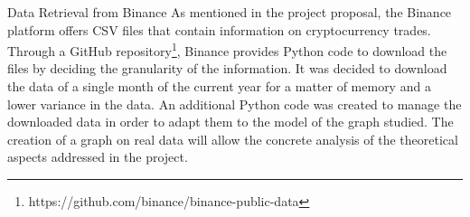 \begin{projsection}{Data Retrieval from Binance}
	As mentioned in the project proposal, the Binance platform offers CSV files that contain information on cryptocurrency trades. Through a GitHub repository\footnote{https://github.com/binance/binance-public-data}, Binance provides Python code to download the files by deciding the granularity of the information. It was decided to download the data of a single month of the current year for a matter of memory and a lower variance in the data.
	An additional Python code was created to manage the downloaded data in order to adapt them to the model of the graph studied. The creation of a graph on real data will allow the concrete analysis of the theoretical aspects addressed in the project.
\end{projsection}


	
